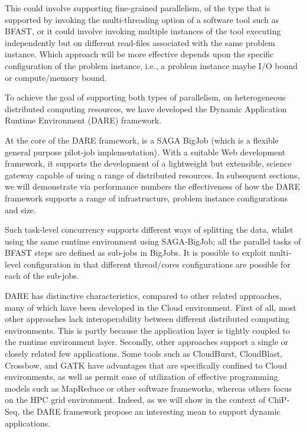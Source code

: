 \documentclass{cpeauth}
\begin{document}
This could involve supporting fine-grained parallelism, of the type
that is supported by invoking the multi-threading option of a software tool such as BFAST, or
it could involve invoking multiple instances of the tool executing
independently but on different read-files associated with the same
problem instance. Which approach will be more effective depends upon
the specific configuration of the problem instance, i.e., a problem
instance maybe I/O bound or compute/memory bound.

To achieve the goal of supporting both types of parallelism, on
heterogeneous distributed computing resources, we have developed the
Dynamic Application Runtime Environment (DARE)
framework\cite{dareurl,dare-tg11,dare-ecmls11}.

At the core of the DARE framework, is a SAGA BigJob (which is a
flexible general purpose pilot-job
implementation)\cite{saga-ccgrid10,saga-royalsoc,saga-web,jha2009developing,ecmls10}.
With a suitable Web development framework, it supports the development
of a lightweight but extensible, science gateway capable of using a
range of distributed resources.  In subsequent sections, we will
demonstrate via performance numbers the effectiveness of how the DARE
framework supports a range of infrastructure, problem instance
configurations and size.

Such task-level concurrency supports different ways of splitting the
data, whilst using the same runtime environment using SAGA-BigJob; all
the parallel tasks of BFAST steps are defined as sub-jobs in BigJobs.
It is possible to exploit multi-level configuration in that different
thread/cores configurations are possible for each of the sub-jobs.

DARE has distinctive characteristics, compared to other related
approaches\cite{taylor2010,cloudburst, cloudblast,
  langmead2009,langmead2010,gatk,halligan2009,luyf-2010}, many of
which have been developed in the Cloud environment.  First of all,
most other approaches lack interoperability between different
distributed computing environments.  This is partly because the
application layer is tightly coupled to the runtime environment layer.
Secondly, other approaches support a single or closely related few
applications.  Some tools such as CloudBurst\cite{cloudburst},
CloudBlast\cite{cloudblast}, Crossbow\cite{langmead2009}, and
GATK\cite{gatk} have advantages that are specifically confined to
Cloud environments, as well as permit ease of utilization of effective
programming models such as MapReduce or other software frameworks,
whereas others\cite{luyf-2010} focus on the HPC grid environment.
Indeed, as we will show in the context of ChiP-Seq, the DARE framework
propose an interesting mean to support dynamic applications.
\end{document}
